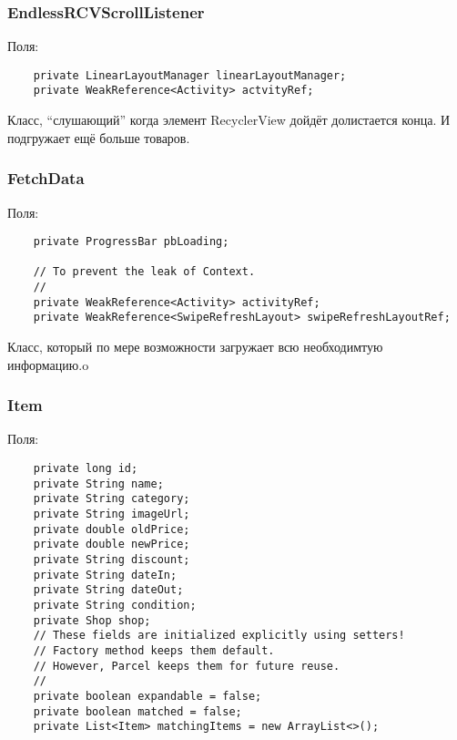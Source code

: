 \subsubsection{EndlessRCVScrollListener}
Поля:\\
\begin{small}
    \begin{verbatim}
    private LinearLayoutManager linearLayoutManager;
    private WeakReference<Activity> actvityRef;
\end{verbatim}
\end{small}
Класс, ``слушающий'' когда элемент RecyclerView дойдёт долистается конца. И подгружает ещё больше товаров.

\subsubsection{FetchData}
Поля:\\
\begin{small}
    \begin{verbatim}
    private ProgressBar pbLoading;

    // To prevent the leak of Context.
    //
    private WeakReference<Activity> activityRef;
    private WeakReference<SwipeRefreshLayout> swipeRefreshLayoutRef;
\end{verbatim}
\end{small}

Класс, который по мере возможности загружает всю необходимтую информацию.o

\subsubsection{Item}
Поля:\\
\begin{small}
    \begin{verbatim}
    private long id;
    private String name;
    private String category;
    private String imageUrl;
    private double oldPrice;
    private double newPrice;
    private String discount;
    private String dateIn;
    private String dateOut;
    private String condition;
    private Shop shop;
    // These fields are initialized explicitly using setters!
    // Factory method keeps them default.
    // However, Parcel keeps them for future reuse.
    //
    private boolean expandable = false;
    private boolean matched = false;
    private List<Item> matchingItems = new ArrayList<>();
\end{verbatim}
\end{small}

